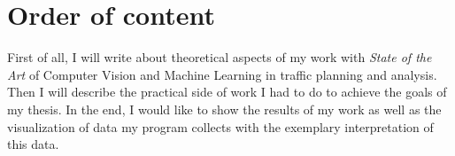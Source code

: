 \section{Order of content}
\label{sec:orderOfContent}
First of all, I will write about theoretical aspects of my work with \textit{State of the Art} of Computer Vision and Machine Learning in traffic planning and analysis. Then I will describe the practical side of work I had to do to achieve the goals of my thesis. In the end, I would like to show the results of my work as well as the visualization of data my program collects with the exemplary interpretation of this data. 














